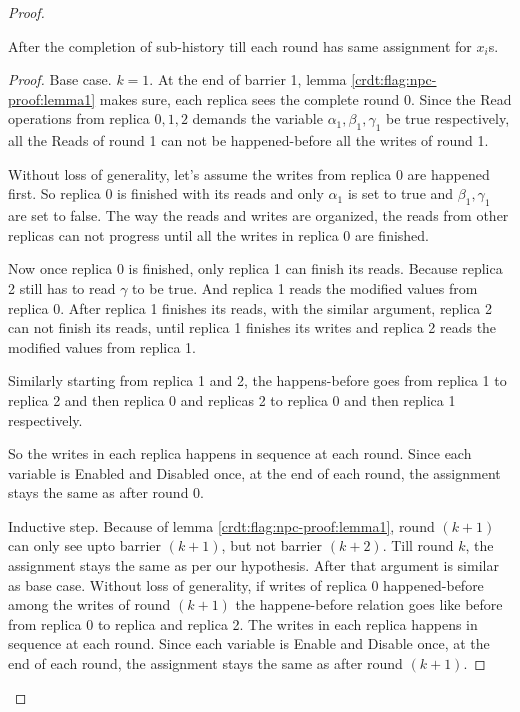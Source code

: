\begin{proof}
  \begin{lemma}
    \label{crdt:flag:npc-proof:lemma2}
    After the completion of sub-history till each round has same assignment for $x_i$s.
  \end{lemma}

  \begin{proof}
    Base case. $k = 1$. At the end of barrier 1, lemma \ref{crdt:flag:npc-proof:lemma1} makes sure, each replica sees the complete round 0.
    Since the \textrm{Read} operations from replica $0, 1, 2$ demands the variable $\alpha_1, \beta_1, \gamma_1$ be true respectively, all the \textrm{Read}s of round 1 can not be happened-before all the writes of round 1.

    Without loss of generality, let's assume the writes from replica 0 are happened first. So replica 0 is finished with its reads and only $\alpha_1$ is set to true and $\beta_1, \gamma_1$ are set to false. The way the reads and writes are organized, the reads from other replicas can not progress until all the writes in replica 0 are finished.

    Now once replica 0 is finished, only replica 1 can finish its reads. Because replica 2 still has to read $\gamma$ to be true. And replica 1 reads the modified values from replica 0. After replica 1 finishes its reads, with the similar argument, replica 2 can not finish its reads, until replica 1 finishes its writes and replica 2 reads the modified values from replica 1.

    Similarly starting from replica 1 and 2, the happens-before goes from replica 1 to replica 2 and then replica 0 and replicas 2 to replica 0 and then replica 1 respectively.

    So the writes in each replica happens in sequence at each round. Since each variable is \textrm{Enable}d and \textrm{Disable}d once, at the end of each round, the assignment stays the same as after round 0.

    Inductive step. Because of lemma \ref{crdt:flag:npc-proof:lemma1}, round $(k+1)$ can only see upto barrier $(k+1)$, but not barrier $(k+2)$. Till round $k$, the assignment stays the same as per our hypothesis. After that argument is similar as base case. Without loss of generality, if writes of replica 0 happened-before among the writes of round $(k+1)$ the happene-before relation goes like before from replica 0 to replica and replica 2. The writes in each replica happens in sequence at each round. Since each variable is \textrm{Enable} and \textrm{Disable} once, at the end of each round, the assignment stays the same as after round $(k+1)$.
  \end{proof}


\end{proof}
